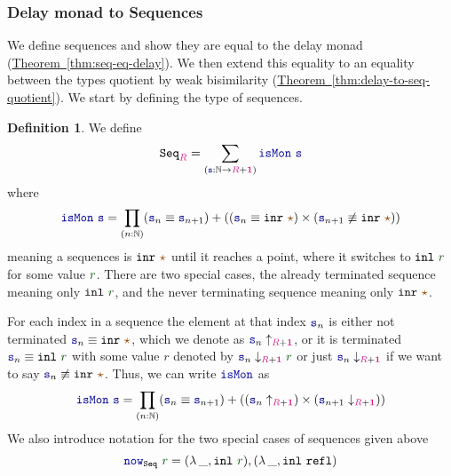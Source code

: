 \documentclass[twoside,11pt,openright]{report}
\theoremstyle{plain} %
\theoremstyle{definition}
\newtheorem{defn}[thm]{Definition}%
\theoremstyle{remark}
\newcommand*{\thmref}[1]{\hyperref[thm:#1]{Theorem~\ref*{thm:#1}}} %
\newcommand*{\term}[1]{\textcolor{green!30!black}{#1}} %
\newcommand*{\type}[1]{\textcolor{magenta!90!black}{#1}}
\newcommand*{\unit}{\type{\textbf{1}}}
\newcommand*{\constant}[1]{\textcolor{orange!60!black}{\ensuremath{\mathtt{#1}}}}
\newcommand*{\function}[1]{\textcolor{blue!60!black}{\ensuremath{\mathtt{#1}}}}
\newcommand*{\typeformer}[1]{\ensuremath{\mathtt{#1}}}
\newcommand*{\unitelem}{\constant{\star}} %
\begin{document}
\subsubsection{Delay monad to Sequences}
We define sequences and show they are equal to the delay monad (\thmref{seq-eq-delay}). We then extend this equality to an equality between the types quotient by weak bisimilarity (\thmref{delay-to-seq-quotient}). We start by defining the type of sequences.
\label{sec:delay-monad-to-sequences}
\begin{defn}
  We define
  \begin{equation}
    \typeformer{Seq}_{\type{R}} = \sum_{(\function{s} : \mathbb{N} \rightarrow \type{R} + \unit)} \function{isMon}~\function{s}
  \end{equation}
  where
  \begin{equation}
    \function{isMon}~\function{s} = \prod_{(n : \mathbb{N})} (\function{s}_n \equiv \function{s}_{n+1})  + ((\function{s}_n \equiv \mathtt{inr}~\unitelem) \times (\function{s}_{n+1} \not\equiv \mathtt{inr}~\unitelem))
  \end{equation}
  meaning a sequences is \(\mathtt{inr}~\unitelem\) until it reaches a point, where it switches to \(\mathtt{inl}~\term{r}\) for some value \(\term{r}\). There are two special cases, the already terminated sequence meaning only \(\mathtt{inl}~\term{r}\), and the never terminating sequence meaning only \(\mathtt{inr}~\unitelem\).
\end{defn}
\noindent For each index in a sequence the element at that index \(\function{s}_n\) is either not terminated \(\function{s}_n \equiv \mathtt{inr}~\unitelem\), which we denote as \(\function{s}_n \uparrow_{\type{R} + \unit}\), or it is terminated \(\function{s}_n \equiv \mathtt{inl}~\term{r}\) with some value \(r\) denoted by \(\function{s}_n \downarrow_{\type{R} + \unit} \term{r}\) or just \(\function{s}_n \downarrow_{\type{R} + \unit}\) if we want to say \(\function{s}_n \not\equiv \mathtt{inr}~\unitelem\). Thus, we can write \(\function{isMon}\) as
\begin{equation}
  \function{isMon}~\function{s} = \prod_{(n : \mathbb{N})} (\function{s}_n \equiv \function{s}_{n+1})  + ((\function{s}_n \uparrow_{\type{R} + \unit}) \times (\function{s}_{n+1} \downarrow_{\type{R} + \unit}))
\end{equation}
We also introduce notation for the two special cases of sequences given above
\begin{equation}
  \function{now}_{\typeformer{Seq}}~\term{r} = (\lambda\,\_, \mathtt{inl}~\term{r}) , (\lambda\,\_, \mathtt{inl}~\mathtt{refl})
\end{equation}
\end{document}
